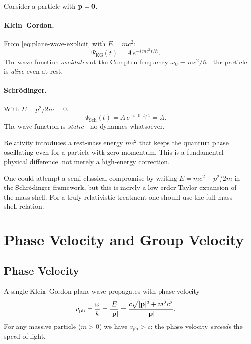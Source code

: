 \documentclass[12pt, a4paper]{article}
\theoremstyle{definition}
\begin{document}
Consider a particle with $\vb{p}=\vb{0}$.

\paragraph{Klein--Gordon.}
From \eqref{eq:plane-wave-explicit} with $E = mc^{2}$:
\begin{equation}\label{eq:KG-at-rest}
    \Psi_{\text{KG}}(t)
    = A\,e^{-i\,mc^{2}\,t/\hbar}.
\end{equation}
The wave function \emph{oscillates} at the Compton frequency
$\omega_{C} = mc^{2}/\hbar$---the particle is \emph{alive} even at rest.

\paragraph{Schr\"{o}dinger.}
With $E = p^{2}/2m = 0$:
\begin{equation}
    \Psi_{\text{Sch}}(t)
    = A\,e^{-i\cdot 0\cdot t/\hbar} = A.
\end{equation}
The wave function is \emph{static}---no dynamics whatsoever.

\begin{warning}
Relativity introduces a rest-mass energy $mc^{2}$ that keeps the quantum
phase oscillating even for a particle with zero momentum.  This is a
fundamental physical difference, not merely a high-energy correction.
\end{warning}

One could attempt a semi-classical compromise by writing $E = mc^{2} + p^{2}/2m$ in the Schr\"{o}dinger framework, but this is merely a low-order Taylor expansion of the mass shell.  For a truly relativistic treatment one should use the full mass-shell relation.

\section{Phase Velocity and Group Velocity}
\label{sec:velocity}

\subsection{Phase Velocity}

A single Klein--Gordon plane wave propagates with phase velocity
\begin{equation}\label{eq:phase-vel}
    v_{\text{ph}}
    = \frac{\omega}{k}
    = \frac{E}{|\vb{p}|}
    = \frac{c\sqrt{|\vb{p}|^{2}+m^{2}c^{2}}}{|\vb{p}|}.
\end{equation}
For any massive particle ($m>0$) we have $v_{\text{ph}} > c$: the phase
velocity \emph{exceeds} the speed of light.
\end{document}
